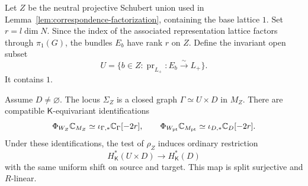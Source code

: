 Let $Z$ be the neutral projective Schubert union used in
Lemma~\ref{lem:correspondence-factorization}, containing the base lattice
$1$.  Set $r=l\dim N$.  Since the index of the associated representation
lattice factors through $\pi_1(G)$, the bundles $E_b$ have rank $r$ on
$Z$.  Define the invariant open subset
\begin{equation}
\label{eq:stable-test-open}
 U=\{b\in Z:\operatorname{pr}_{L_+}:E_b\xrightarrow{\sim}L_+\}.
\end{equation}
It contains $1$.

\begin{lemma}
\label{lem:quadratic-test}
Assume $D\neq\varnothing$.  The locus $\Sigma_Z$ is a closed graph
$\Gamma\simeq U\times D$ in $M_Z$.  There are compatible
$\mathsf K$-equivariant identifications
\begin{equation}
\label{eq:quadratic-vanishing-cycles}
 \Phi_{W_Z}\mathbb C_{M_Z}
 \simeq \iota_{\Gamma,*}\mathbb C_\Gamma[-2r],
 \qquad
 \Phi_{W_{\mathrm{pt}}}\mathbb C_{M_{\mathrm{pt}}}
 \simeq \iota_{D,*}\mathbb C_D[-2r].
\end{equation}
Under these identifications, the test of $\rho_Z$ induces ordinary
restriction
\begin{equation}
\label{eq:quadratic-restriction}
 H_{\mathsf K}^*(U\times D)\longrightarrow H_{\mathsf K}^*(D)
\end{equation}
with the same uniform shift on source and target.  This map is split
surjective and $R$-linear.
\end{lemma}

